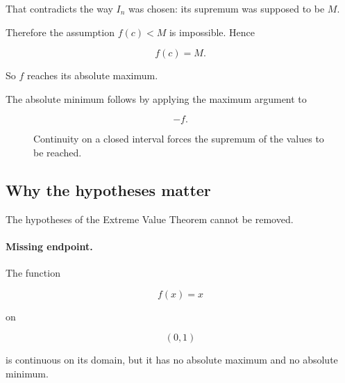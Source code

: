 That contradicts the way \(I_n\) was chosen: its supremum was supposed to be \(M\).

Therefore the assumption \(f(c)<M\) is impossible.  Hence

\[
f(c)=M.
\]

So \(f\) reaches its absolute maximum.

The absolute minimum follows by applying the maximum argument to

\[
-f.
\]

\begin{figure}[h]
\centering
{}
\caption{Continuity on a closed interval forces the supremum of the values to be reached.}
\label{fig:evt-maximum-reached}
\end{figure}

\subsection{Why the hypotheses matter}
\label{appsubsec:evt-hypotheses-matter}

The hypotheses of the Extreme Value Theorem cannot be removed.

\paragraph{Missing endpoint.}
The function

\[
f(x)=x
\]

on

\[
(0,1)
\]

is continuous on its domain, but it has no absolute maximum and no absolute minimum.

